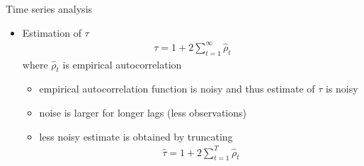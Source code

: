 \documentclass[finnish,english,t]{beamer}
\begin{document}
\begin{frame}{Time series analysis}

    \vspace{-0.5\baselineskip}
  \begin{itemize}
  \item Estimation of $\tau$
    \vspace{-1.5\baselineskip}
    \begin{align*}
      \tau = 1 + 2 \sum_{t=1}^\infty \hat{\rho}_t
    \end{align*}
    where $\hat{\rho}_t$ is empirical autocorrelation \\
    \begin{itemize}
    \item<3-> empirical autocorrelation function is noisy and thus
      estimate of $\tau$ is noisy
    \item<3-> noise is larger for longer lags (less observations)
    \item<4-> less noisy estimate is obtained by truncating
    \begin{align*}
      \hat{\tau} = 1 + 2 \sum_{t=1}^T \hat{\rho}_t
    \end{align*}
    \end{itemize}

    \end{itemize}
\end{frame}
\end{document}
